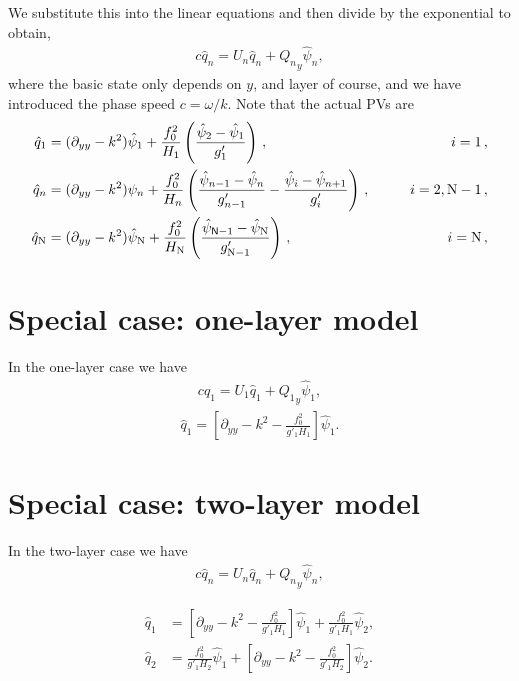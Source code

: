 \documentclass[11pt]{article}
\begin{document}
We substitute this into the linear equations and then divide by the exponential to obtain,
\begin{align}
c  {\hat q_n}  =  U_n {\hat q_n} +  {Q_n}_y {\hat \psi_n} ,
\end{align}
where the basic state only depends on $y$, and layer of course, and we have introduced the phase speed $c=\omega/k$.  Note that the actual PVs are
\begin{align}
{\hat q_1} &= (\partial_{yy} - k^2) \hat \psi_1 + \frac{f_0^2}{H_1} \left(\frac{\hat \psi_{2}-\hat \psi_1}{g'_{1}}\right)\,,  \qquad & i =1\, , \nonumber \\
{\hat q_n} &= (\partial_{yy} - k^2)\psi_n + \frac{f_0^2}{H_n} \left(\frac{\hat \psi_{n-1}-
\hat \psi_n}{g'_{n-1}}  - \frac{\hat \psi_{i}-\hat \psi_{n+1}}{g'_{i}}\right)\,,  \qquad &i = 2,\mathrm{N}-1 \, , \nonumber \\
{\hat q_{\mathrm{N}}} &= (\partial_{yy} - k^2)\hat \psi_{\mathrm{N}} + \frac{f_0^2}{H_{\mathrm{N}}} \left(\frac{\hat \psi_{\textsf{N}-1} - \hat \psi_{\mathrm{N}}}{g'_{\mathrm{N}-1}}\right)\,,  \qquad & i =\mathrm{N}\,,
\end{align}

\section*{Special case: one-layer model}

In the one-layer case we have
\begin{align}
c  {\hat q_1}  =  U_1 {\hat q_1} +  {Q_1}_y {\hat \psi_1} ,
\end{align}
\begin{align}
{\hat q_1} = \left[ \partial_{yy} - k^2 -  \frac{f_0^2}{g'_1 H_1} \right] \hat \psi_1.
\end{align}

\section*{Special case: two-layer model}

In the two-layer case we have
\begin{align}
c  {\hat q_n}  =  U_n {\hat q_n} +  {Q_n}_y {\hat \psi_n} ,
\end{align}

\begin{align}
{\hat q_1} &= \left[ \partial_{yy} - k^2 -  \frac{f_0^2}{g'_1 H_1}\right] \hat \psi_1 + \frac{f_0^2}{g'_1 H_1} \hat \psi_{2}, \\
{\hat q_2} &= \frac{f_0^2}{g'_1 H_2}\hat \psi_1+ \left[ \partial_{yy} - k^2 -  \frac{f_0^2}{g'_1 H_2} \right] \hat \psi_2 
.
\end{align}
\end{document}

